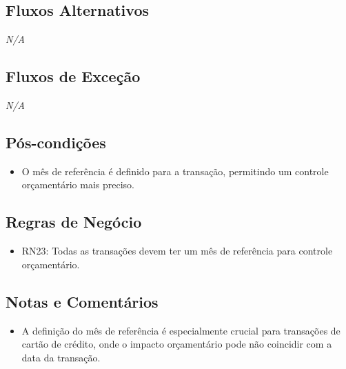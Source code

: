 \subsection*{Fluxos Alternativos}
\textit{N/A}

\subsection*{Fluxos de Exceção}
\textit{N/A}

\subsection*{Pós-condições}
\begin{addmargin}[1.5cm]{0cm}
	\begin{itemize}
		\item O mês de referência é definido para a transação, permitindo um controle orçamentário mais preciso.
	\end{itemize}
\end{addmargin}

\subsection*{Regras de Negócio}
\begin{addmargin}[1.5cm]{0cm}
	\begin{itemize}
		\item RN23: Todas as transações devem ter um mês de referência para controle orçamentário.
	\end{itemize}
\end{addmargin}

\subsection*{Notas e Comentários}
\begin{addmargin}[1.5cm]{0cm}
	\begin{itemize}
		\item A definição do mês de referência é especialmente crucial para transações de cartão de crédito, onde o impacto orçamentário pode não coincidir com a data da transação.
	\end{itemize}
\end{addmargin}